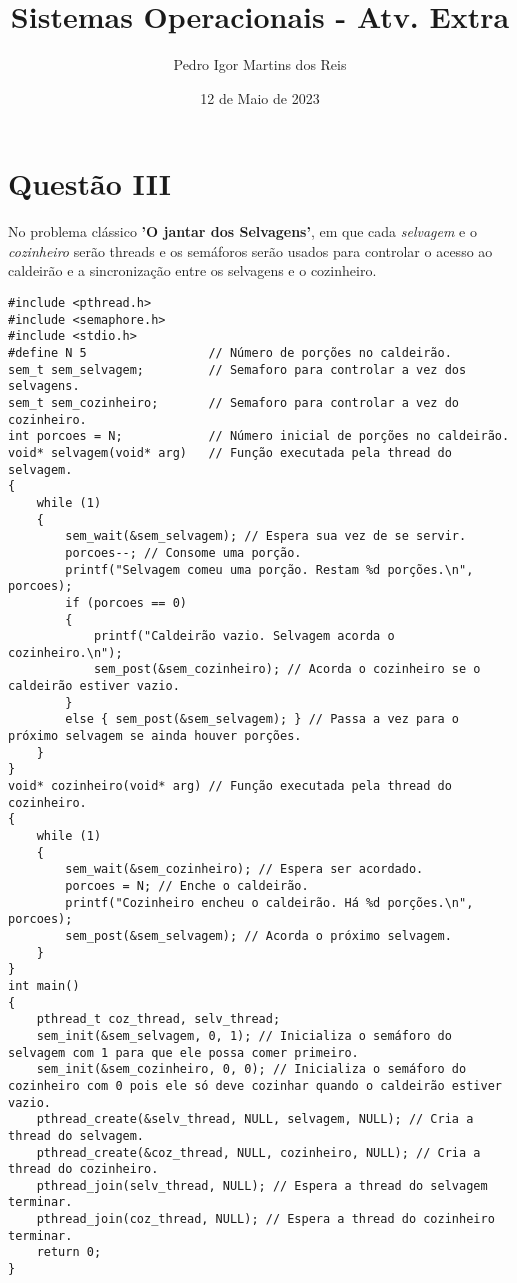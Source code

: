 \documentclass[12pt]{article}
\title{Sistemas Operacionais - Atv. Extra}
\author{Pedro Igor Martins dos Reis}
\date{12 de Maio de 2023}
\begin{document}
\maketitle
\section{Questão III}
No problema clássico \textbf{'O jantar dos Selvagens'}, em que cada
\textit{selvagem} e o \textit{cozinheiro} serão threads e os semáforos serão usados para
controlar o acesso ao caldeirão e a sincronização entre os selvagens e o cozinheiro.
\begin{lstlisting}[caption=O jantar dos Selvagens,style=FiraCodeStyle]
#include <pthread.h>
#include <semaphore.h>
#include <stdio.h>
#define N 5                 // Número de porções no caldeirão.
sem_t sem_selvagem;         // Semaforo para controlar a vez dos selvagens.
sem_t sem_cozinheiro;       // Semaforo para controlar a vez do cozinheiro.
int porcoes = N;            // Número inicial de porções no caldeirão.
void* selvagem(void* arg)   // Função executada pela thread do selvagem.
{
    while (1)
    {
        sem_wait(&sem_selvagem); // Espera sua vez de se servir.
        porcoes--; // Consome uma porção.
        printf("Selvagem comeu uma porção. Restam %d porções.\n", porcoes);
        if (porcoes == 0)
        {
            printf("Caldeirão vazio. Selvagem acorda o cozinheiro.\n");
            sem_post(&sem_cozinheiro); // Acorda o cozinheiro se o caldeirão estiver vazio.
        }
        else { sem_post(&sem_selvagem); } // Passa a vez para o próximo selvagem se ainda houver porções.
    }
}
void* cozinheiro(void* arg) // Função executada pela thread do cozinheiro.
{
    while (1)
    {
        sem_wait(&sem_cozinheiro); // Espera ser acordado.
        porcoes = N; // Enche o caldeirão.
        printf("Cozinheiro encheu o caldeirão. Há %d porções.\n", porcoes);
        sem_post(&sem_selvagem); // Acorda o próximo selvagem.
    }
}
int main()
{
    pthread_t coz_thread, selv_thread;
    sem_init(&sem_selvagem, 0, 1); // Inicializa o semáforo do selvagem com 1 para que ele possa comer primeiro.
    sem_init(&sem_cozinheiro, 0, 0); // Inicializa o semáforo do cozinheiro com 0 pois ele só deve cozinhar quando o caldeirão estiver vazio.
    pthread_create(&selv_thread, NULL, selvagem, NULL); // Cria a thread do selvagem.
    pthread_create(&coz_thread, NULL, cozinheiro, NULL); // Cria a thread do cozinheiro.
    pthread_join(selv_thread, NULL); // Espera a thread do selvagem terminar.
    pthread_join(coz_thread, NULL); // Espera a thread do cozinheiro terminar.
    return 0;
}
\end{lstlisting}
\end{document}

